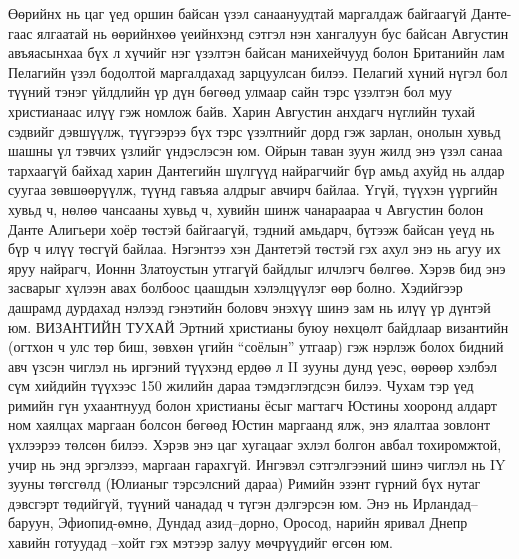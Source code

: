 Өөрийнх нь цаг үед оршин байсан үзэл санаануудтай маргалдаж байгаагүй Данте-гаас ялгаатай нь өөрийнхөө үеийнхэнд сэтгэл нэн хангалуун бус байсан Августин авъяасынхаа бүх л хүчийг нэг үзэлтэн байсан манихейчууд болон Британийн лам Пелагийн үзэл бодолтой маргалдахад зарцуулсан билээ. Пелагий хүний нүгэл бол түүний тэнэг үйлдлийн үр дүн бөгөөд улмаар сайн тэрс үзэлтэн бол муу христианаас илүү гэж номлож байв. Харин Августин анхдагч нүглийн тухай сэдвийг дэвшүүлж, түүгээрээ бүх тэрс үзэлтнийг дорд гэж зарлан, онолын хувьд шашны үл тэвчих үзлийг үндэслэсэн юм. Ойрын таван зуун жилд энэ үзэл санаа тархаагүй байхад харин Дантегийн шүлгүүд найрагчийг бүр амьд ахуйд нь алдар суугаа зөвшөөрүүлж, түүнд гавъяа алдрыг авчирч байлаа. Үгүй, түүхэн үүргийн хувьд ч, нөлөө чансааны хувьд ч, хувийн шинж чанараараа ч Августин болон Данте Алигьери хоёр төстэй байгаагүй, тэдний амьдарч, бүтээж байсан үеүд нь бүр ч илүү төсгүй байлаа. Нэгэнтээ хэн Дантетэй төстэй гэх ахул энэ нь агуу их яруу найрагч, Ионнн Златоустын утгагүй байдлыг илчлэгч бөлгөө. Хэрэв бид энэ засварыг хүлээн авах болбоос цаашдын хэлэлцүүлэг өөр болно. Хэдийгээр дашрамд дурдахад нэлээд гэнэтийн боловч энэхүү шинэ зам нь илүү үр дүнтэй юм.
ВИЗАНТИЙН ТУХАЙ
Эртний христианы буюу нөхцөлт байдлаар византийн (огтхон ч улс төр биш, зөвхөн үгийн “соёлын” утгаар) гэж нэрлэж болох бидний авч үзсэн чиглэл нь иргэний түүхэнд ердөө л II зууны дунд үеэс, өөрөөр хэлбэл сүм хийдийн түүхээс 150 жилийн дараа тэмдэглэгдсэн билээ. Чухам тэр үед римийн гүн ухаантнууд болон христианы ёсыг магтагч Юстины хооронд алдарт ном хаялцах маргаан болсон бөгөөд Юстин маргаанд ялж, энэ ялалтаа зовлонт үхлээрээ төлсөн билээ. Хэрэв энэ цаг хугацааг эхлэл болгон авбал тохиромжтой, учир нь энд эргэлзээ, маргаан гарахгүй. Ингэвэл сэтгэлгээний шинэ чиглэл нь IY зууны төгсгөлд (Юлианыг тэрсэлсний дараа) Римийн эзэнт гүрний бүх нутаг дэвсгэрт төдийгүй, түүний чанадад ч түгэн дэлгэрсэн юм. Энэ нь Ирландад–баруун, Эфиопид-өмнө, Дундад азид–дорно, Оросод, нарийн яривал Днепр хавийн готуудад –хойт гэх мэтээр залуу мөчрүүдийг өгсөн юм.
